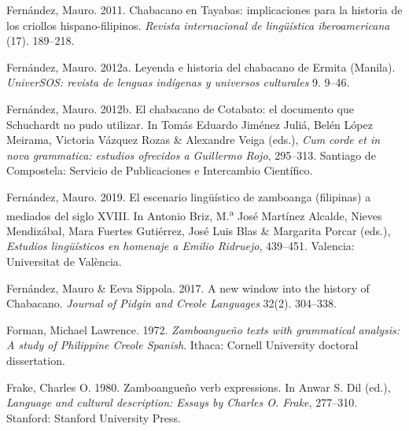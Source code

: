 \begin{styleBibliography}
Fernández, Mauro. 2011. Chabacano en Tayabas: implicaciones para la historia de los criollos hispano-filipinos. \textit{Revista internacional de lingüística iberoamericana} (17). 189–218.
\end{styleBibliography}

\begin{styleBibliography}
Fernández, Mauro. 2012a. Leyenda e historia del chabacano de Ermita (Manila). \textit{UniverSOS: revista de lenguas indígenas y universos culturales} 9. 9–46.
\end{styleBibliography}

\begin{styleBibliography}
Fernández, Mauro. 2012b. El chabacano de Cotabato: el documento que Schuchardt no pudo utilizar. In Tomás Eduardo Jiménez Juliá, Belén López Meirama, Victoria Vázquez Rozas \& Alexandre Veiga (eds.), \textit{Cum corde et in nova grammatica: estudios ofrecidos a Guillermo Rojo}, 295–313. Santiago de Compostela: Servicio de Publicaciones e Intercambio Científico.
\end{styleBibliography}

\begin{styleBibliography}
Fernández, Mauro. 2019. El escenario lingüístico de zamboanga (filipinas) a mediados del siglo XVIII. In Antonio Briz, M.\textsuperscript{a} José Martínez Alcalde, Nieves Mendizábal, Mara Fuertes Gutiérrez, José Luis Blas \& Margarita Porcar (eds.), \textit{Estudios lingüísticos en homenaje a Emilio Ridruejo}, 439–451. Valencia: Universitat de València.
\end{styleBibliography}

\begin{styleBibliography}
Fernández, Mauro \& Eeva Sippola. 2017. A new window into the history of Chabacano. \textit{Journal of Pidgin and Creole Languages} 32(2). 304–338.
\end{styleBibliography}

\begin{styleBibliography}
Forman, Michael Lawrence. 1972. \textit{Zamboangueño texts with grammatical analysis: A study of Philippine Creole Spanish}. Ithaca: Cornell University doctoral dissertation.
\end{styleBibliography}

\begin{styleBibliography}
Frake, Charles O. 1980. Zamboangueño verb expressions. In Anwar S. Dil (ed.), \textit{Language and cultural description: Essays by Charles O. Frake}, 277–310. Stanford: Stanford University Press.
\end{styleBibliography}

